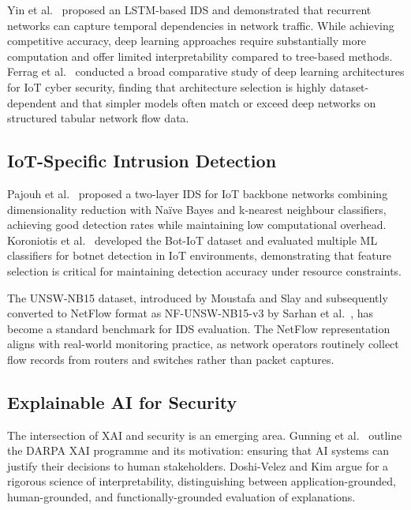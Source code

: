 \documentclass[12pt,a4paper]{article}
\begin{document}
Yin et al.\ \cite{yin2017deep} proposed an LSTM-based IDS and demonstrated that
recurrent networks can capture temporal dependencies in network traffic. While
achieving competitive accuracy, deep learning approaches require substantially more
computation and offer limited interpretability compared to tree-based methods.
Ferrag et al.\ \cite{ferrag2020deep} conducted a broad comparative study of deep
learning architectures for IoT cyber security, finding that architecture selection
is highly dataset-dependent and that simpler models often match or exceed deep
networks on structured tabular network flow data.

\subsection{IoT-Specific Intrusion Detection}

Pajouh et al.\ \cite{pajouh2018iot} proposed a two-layer IDS for IoT backbone
networks combining dimensionality reduction with Na\"ive Bayes and k-nearest
neighbour classifiers, achieving good detection rates while maintaining low
computational overhead. Koroniotis et al.\ \cite{koroniotis2019iot} developed the
Bot-IoT dataset and evaluated multiple ML classifiers for botnet detection in IoT
environments, demonstrating that feature selection is critical for maintaining
detection accuracy under resource constraints.

The UNSW-NB15 dataset, introduced by Moustafa and Slay \cite{moustafa2015unsw} and
subsequently converted to NetFlow format as NF-UNSW-NB15-v3 by Sarhan et al.\
\cite{sarhan2021netflow,sarhan2022towards}, has become a standard benchmark for
IDS evaluation. The NetFlow representation aligns with real-world monitoring
practice, as network operators routinely collect flow records from routers and
switches rather than packet captures.

\subsection{Explainable AI for Security}

The intersection of XAI and security is an emerging area. Gunning et al.\
\cite{gunning2019xai} outline the DARPA XAI programme and its motivation: ensuring
that AI systems can justify their decisions to human stakeholders. Doshi-Velez and
Kim \cite{doshi2017towards} argue for a rigorous science of interpretability,
distinguishing between application-grounded, human-grounded, and functionally-grounded
evaluation of explanations.
\end{document}

